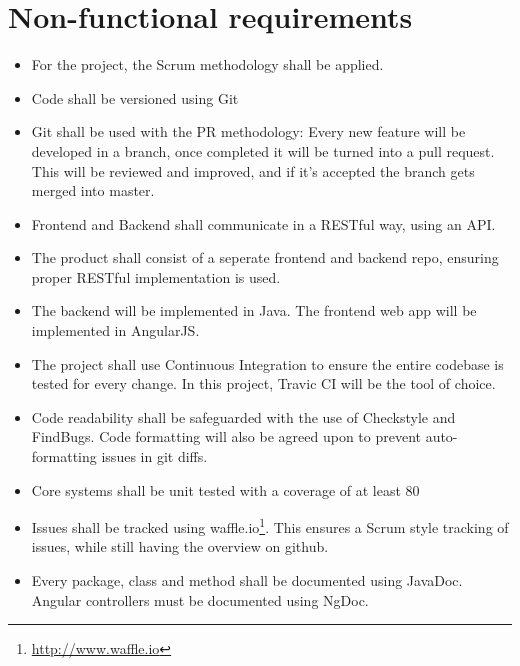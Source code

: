 \chapter{Non-functional requirements}
\begin{itemize}

\item For the project, the Scrum methodology shall be applied.

\item Code shall be versioned using Git

\item Git shall be used with the PR methodology: Every new feature will be developed in a branch, once completed it will be turned into a pull request. This will be reviewed and improved, and if it's accepted the branch gets merged into master.

\item Frontend and Backend shall communicate in a RESTful way, using an API.

\item The product shall consist of a seperate frontend and backend repo, ensuring proper RESTful implementation is used.

\item The backend will be implemented in Java. The frontend web app will be implemented in AngularJS. 

\item The project shall use Continuous Integration to ensure the entire codebase is tested for every change. In this project, Travic CI will be the tool of choice.

\item Code readability shall be safeguarded with the use of Checkstyle and FindBugs. Code formatting will also be agreed upon to prevent auto-formatting issues in git diffs.

\item Core systems shall be unit tested with a coverage of at least 80%

\item Issues shall be tracked using waffle.io\footnote{\url{http://www.waffle.io}}. This ensures a Scrum style tracking of issues, while still having the overview on github.

\item Every package, class and method shall be documented using JavaDoc. Angular controllers must be documented using NgDoc. 

\end{itemize}